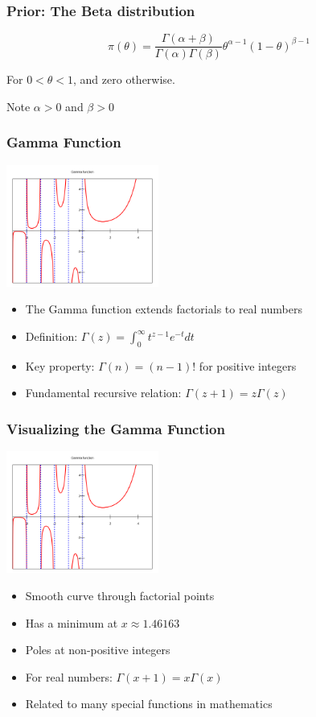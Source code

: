 \documentclass[12pt]{beamer}
\begin{document}
\begin{frame}
	\frametitle{Prior: The Beta distribution}
	
	\[
	\pi(\theta) = \frac{\Gamma(\alpha + \beta)}{\Gamma(\alpha)\Gamma(\beta)}\theta^{\alpha-1}(1-\theta)^{\beta-1}
	\]
	
	
	For $0 < \theta < 1$, and zero otherwise.
	
	
	Note $\alpha > 0$ and $\beta > 0$
	
\end{frame}
\begin{frame}
	\frametitle{Gamma Function}
	\centering
	\includegraphics[width=5cm]{gamma.png}
	\begin{itemize}[label={\color{blue}$\blacktriangleright$}]
		\item The Gamma function extends factorials to real numbers
		\item Definition: $\Gamma(z) = \int_0^\infty t^{z-1}e^{-t}dt$
		\item Key property: $\Gamma(n) = (n-1)!$ for positive integers
		\item Fundamental recursive relation: $\Gamma(z+1) = z\Gamma(z)$
	\end{itemize}
\end{frame}

\begin{frame}
	\frametitle{Visualizing the Gamma Function}
	\centering
	\includegraphics[width=5cm]{gamma.png}
	\begin{itemize}[label={\color{blue}$\blacktriangleright$}]
		
		\item Smooth curve through factorial points
		\item Has a minimum at $x \approx 1.46163$
		\item Poles at non-positive integers
		\item For real numbers: $\Gamma(x+1) = x\Gamma(x)$
		\item Related to many special functions in mathematics
	\end{itemize}
\end{frame}
\end{document}
